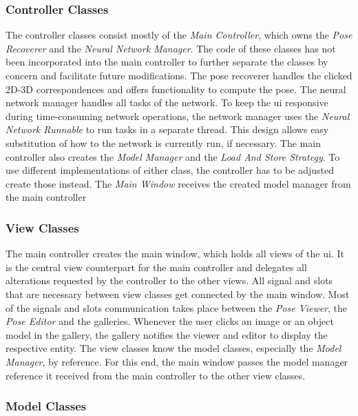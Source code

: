 \subsubsection{Controller Classes}

The controller classes consist mostly of the \textit{Main Controller}, which owns the \textit{Pose Recoverer} and the \textit{Neural Network Manager}. The code of these classes has not been incorporated into the main controller to further separate the classes by concern and facilitate future modifications. The pose recoverer handles the clicked 2D-3D correspondences and offers functionality to compute the pose. The neural network manager handles all tasks of the network. To keep the \ac{ui} responsive during time-consuming network operations, the network manager uses the \textit{Neural Network Runnable} to run tasks in a separate thread. This design allows easy substitution of how to the network is currently run, if necessary. The main controller also creates the \textit{Model Manager} and the \textit{Load And Store Strategy}. To use different implementations of either class, the controller has to be adjusted create those instead. The \textit{Main Window} receives the created model manager from the main controller

\subsubsection{View Classes}

The main controller creates the main window, which holds all views of the \ac{ui}. It is the central view counterpart for the main controller and delegates all alterations requested by the controller to the other views. All signal and slots that are necessary between view classes get connected by the main window. Most of the signals and slots communication takes place between the \textit{Pose Viewer}, the \textit{Pose Editor} and the galleries. Whenever the user clicks an image or an object model in the gallery, the gallery notifies the viewer and editor to display the respective entity. The view classes know the model classes, especially the \textit{Model Manager}, by reference. For this end, the main window passes the model manager reference it received from the main controller to the other view classes.

\subsubsection{Model Classes}


